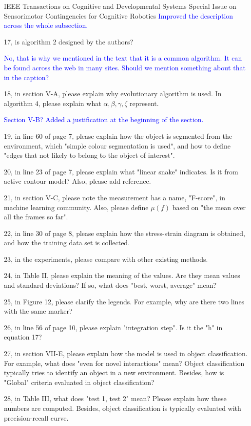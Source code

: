 \documentclass[a4paper,12pt]{letter}
\newcommand{\comment}[1]{\textcolor{blue}{#1}}
\begin{document}
\begin{letter}{IEEE Transactions on Cognitive and Developmental Systems\newline
Special Issue on Sensorimotor Contingencies for Cognitive Robotics}
\comment{Improved the description across the whole subsection.}

17, is algorithm 2 designed by the authors?

\comment{No, that is why we mentioned in the text that it is a common algorithm.  It can be found across the web in many sites.  Should we mention something about that in the caption?}

18, in section V-A, please explain why evolutionary algorithm is used. In algorithm 4, please explain what $\alpha, \beta, \gamma, \zeta$ represent.

\comment{Section V-B? Added a justification at the beginning of the section.}

19, in line 60 of page 7, please explain how the object is segmented from the environment, which "simple colour segmentation is used", and how to define "edges that not likely to belong to the object of interest". 

20, in line 23 of page 7, please explain what "linear snake" indicates. Is it from active contour model? Also, please add reference. 

21, in section V-C, please note the measurement has a name, "F-score", in machine learning community. Also, please define $\mu(f)$ based on "the mean over all the frames so far". 

22, in line 30 of page 8, please explain how the stress-strain diagram is obtained, and how the training data set is collected. 

23, in the experiments, please compare with other existing methods. 

24, in Table II, please explain the meaning of the values. Are they mean values and standard deviations? If so, what does "best, worst, average" mean? 

25, in Figure 12, please clarify the legends. For example, why are there two lines with the same marker? 

26, in line 56 of page 10, please explain "integration step". Is it the "h" in equation 17? 

27, in section VII-E, please explain how the model is used in object classification. For example, what does "even for novel interactions" mean? Object classification typically tries to identify an object in a new environment. Besides, how is "Global" criteria evaluated in object classification? 

28, in Table III, what does "test 1, test 2" mean? Please explain how these numbers are computed. Besides, object classification is typically evaluated with precision-recall curve. 


\end{letter}
\end{document}
